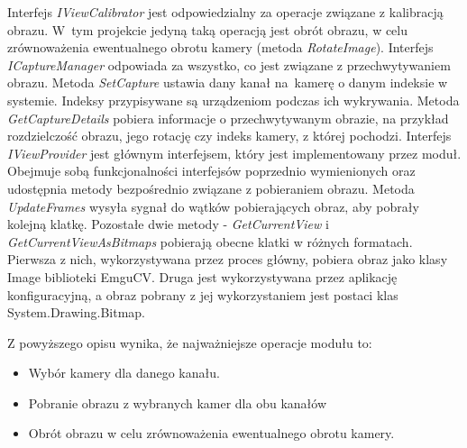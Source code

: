 \documentclass[a4paper,11pt,twoside]{report}
\theoremstyle{definition}
\begin{document}
Interfejs \textit{IViewCalibrator} jest odpowiedzialny za operacje związane z kalibracją obrazu. W~tym projekcie jedyną taką operacją jest obrót obrazu, w celu zrównoważenia ewentualnego obrotu kamery (metoda \textit{RotateImage}).
Interfejs \textit{ICaptureManager} odpowiada za wszystko, co jest związane z przechwytywaniem obrazu. Metoda \textit{SetCapture} ustawia dany kanał na~kamerę o danym indeksie w systemie. Indeksy przypisywane są urządzeniom podczas ich wykrywania. Metoda \textit{GetCaptureDetails} pobiera informacje o przechwytywanym obrazie, na przykład rozdzielczość obrazu, jego rotację czy indeks kamery, z której pochodzi.
Interfejs \textit{IViewProvider} jest głównym interfejsem, który jest implementowany przez moduł. Obejmuje sobą funkcjonalności interfejsów poprzednio wymienionych oraz udostępnia metody bezpośrednio związane z pobieraniem obrazu. Metoda \textit{UpdateFrames} wysyła sygnał do wątków pobierających obraz, aby pobrały kolejną klatkę. Pozostałe dwie metody - \textit{GetCurrentView} i \textit{GetCurrentViewAsBitmaps} pobierają obecne klatki w różnych formatach. Pierwsza z nich, wykorzystywana przez proces główny, pobiera obraz jako klasy Image biblioteki EmguCV. Druga jest wykorzystywana przez aplikację konfiguracyjną, a obraz pobrany z jej wykorzystaniem jest postaci klas System.Drawing.Bitmap.

Z powyższego opisu wynika, że najważniejsze operacje modułu to:
\begin{itemize}
\item Wybór kamery dla danego kanału.
\item Pobranie obrazu z wybranych kamer dla obu kanałów
\item Obrót obrazu w celu zrównoważenia ewentualnego obrotu kamery.
\end{itemize}
\end{document}
